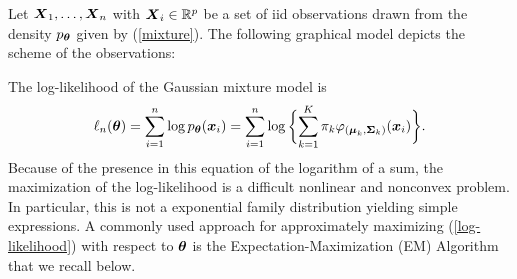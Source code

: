 Let $\boldsymbol X_1,\dots,\boldsymbol X_n$ with $\boldsymbol X_i\in {\mathbb R}^p$ be a set of iid observations drawn from the density $p_{{\boldsymbol\theta}}$
given by (\ref{mixture}). The following graphical model depicts the scheme of the observations:
\begin{figure}[h]
\centering\small
{}
\end{figure}

The log-likelihood of the Gaussian mixture model is
\begin{equation}\label{log-likelihood}
\ell_n({\boldsymbol\theta})=\sum_{i=1}^{n}\log{p_{{\boldsymbol\theta}}(\boldsymbol x_i)}=
\sum_{i=1}^{n}\log\bigg\{{\sum_{k=1}^K\pi_k\varphi_{(\boldsymbol\mu_{k},\boldsymbol\Sigma_{k})}(\boldsymbol x_i)}\bigg\}.
\end{equation}
Because of the presence in this equation of the logarithm of a sum, the maximization of the log-likelihood is
a difficult nonlinear and nonconvex problem. In particular, this is not a exponential family distribution yielding simple expressions.
A commonly used approach for approximately maximizing (\ref{log-likelihood}) with respect to ${\boldsymbol\theta}$ is the Expectation-Maximization
(EM) Algorithm \citep{dempster77} that we recall below.


